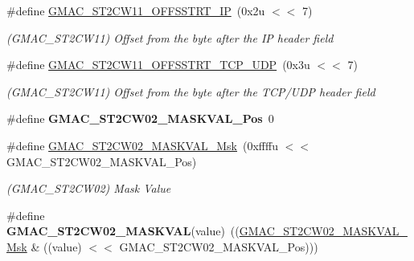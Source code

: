 \begin{DoxyCompactItemize}
\mbox{\label{group__SAMV71__GMAC_ga30158e102fa028fda2b792da21e45531}} 
\#define \mbox{\hyperlink{group__SAMV71__GMAC_ga30158e102fa028fda2b792da21e45531}{G\+M\+A\+C\+\_\+\+S\+T2\+C\+W11\+\_\+\+O\+F\+F\+S\+S\+T\+R\+T\+\_\+\+IP}}~(0x2u $<$$<$ 7)
\begin{DoxyCompactList}\small\item\em (G\+M\+A\+C\+\_\+\+S\+T2\+C\+W11) Offset from the byte after the IP header field \end{DoxyCompactList}\item 
\mbox{\label{group__SAMV71__GMAC_gaf23f541bf8ed39537580c88f9b466aaa}} 
\#define \mbox{\hyperlink{group__SAMV71__GMAC_gaf23f541bf8ed39537580c88f9b466aaa}{G\+M\+A\+C\+\_\+\+S\+T2\+C\+W11\+\_\+\+O\+F\+F\+S\+S\+T\+R\+T\+\_\+\+T\+C\+P\+\_\+\+U\+DP}}~(0x3u $<$$<$ 7)
\begin{DoxyCompactList}\small\item\em (G\+M\+A\+C\+\_\+\+S\+T2\+C\+W11) Offset from the byte after the T\+C\+P/\+U\+DP header field \end{DoxyCompactList}\item 
\mbox{\label{group__SAMV71__GMAC_ga6793690c08f59e954b52ea685b16d187}} 
\#define {\bfseries G\+M\+A\+C\+\_\+\+S\+T2\+C\+W02\+\_\+\+M\+A\+S\+K\+V\+A\+L\+\_\+\+Pos}~0
\item 
\mbox{\label{group__SAMV71__GMAC_gab6ec87c6d8088f6315c48c31740e84fe}} 
\#define \mbox{\hyperlink{group__SAMV71__GMAC_gab6ec87c6d8088f6315c48c31740e84fe}{G\+M\+A\+C\+\_\+\+S\+T2\+C\+W02\+\_\+\+M\+A\+S\+K\+V\+A\+L\+\_\+\+Msk}}~(0xffffu $<$$<$ G\+M\+A\+C\+\_\+\+S\+T2\+C\+W02\+\_\+\+M\+A\+S\+K\+V\+A\+L\+\_\+\+Pos)
\begin{DoxyCompactList}\small\item\em (G\+M\+A\+C\+\_\+\+S\+T2\+C\+W02) Mask Value \end{DoxyCompactList}\item 
\mbox{\label{group__SAMV71__GMAC_ga47bd2e93b68127a91b07f47ceca616f7}} 
\#define {\bfseries G\+M\+A\+C\+\_\+\+S\+T2\+C\+W02\+\_\+\+M\+A\+S\+K\+V\+AL}(value)~((\mbox{\hyperlink{group__SAMV71__GMAC_gab6ec87c6d8088f6315c48c31740e84fe}{G\+M\+A\+C\+\_\+\+S\+T2\+C\+W02\+\_\+\+M\+A\+S\+K\+V\+A\+L\+\_\+\+Msk}} \& ((value) $<$$<$ G\+M\+A\+C\+\_\+\+S\+T2\+C\+W02\+\_\+\+M\+A\+S\+K\+V\+A\+L\+\_\+\+Pos)))

\end{DoxyCompactItemize}
